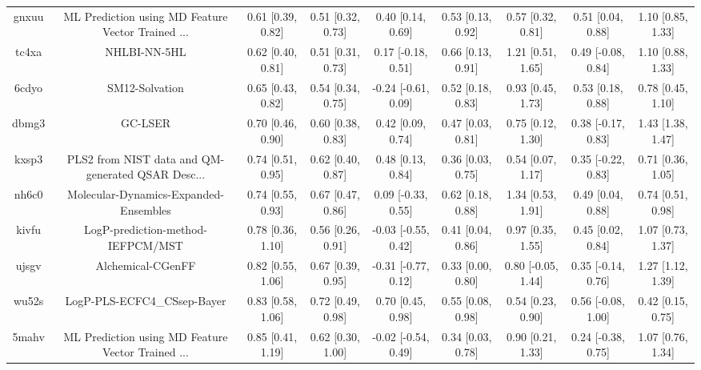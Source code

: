 \documentclass{article}
\begin{document}
\begin{center}
\begin{longtable}{|ccccccccc|}
 gnxuu &  ML Prediction using MD Feature Vector Trained ... &  0.61 [0.39, 0.82] &  0.51 [0.32, 0.73] &     0.40 [0.14, 0.69] &  0.53 [0.13, 0.92] &    0.57 [0.32, 0.81] &    0.51 [0.04, 0.88] &     1.10 [0.85, 1.33] \\
 tc4xa &                                       NHLBI-NN-5HL &  0.62 [0.40, 0.81] &  0.51 [0.31, 0.73] &    0.17 [-0.18, 0.51] &  0.66 [0.13, 0.91] &    1.21 [0.51, 1.65] &   0.49 [-0.08, 0.84] &     1.10 [0.88, 1.33] \\
 6cdyo &                                     SM12-Solvation &  0.65 [0.43, 0.82] &  0.54 [0.34, 0.75] &   -0.24 [-0.61, 0.09] &  0.52 [0.18, 0.83] &    0.93 [0.45, 1.73] &    0.53 [0.18, 0.88] &     0.78 [0.45, 1.10] \\
 dbmg3 &                                            GC-LSER &  0.70 [0.46, 0.90] &  0.60 [0.38, 0.83] &     0.42 [0.09, 0.74] &  0.47 [0.03, 0.81] &    0.75 [0.12, 1.30] &   0.38 [-0.17, 0.83] &     1.43 [1.38, 1.47] \\
 kxsp3 &  PLS2 from NIST data and QM-generated QSAR Desc... &  0.74 [0.51, 0.95] &  0.62 [0.40, 0.87] &     0.48 [0.13, 0.84] &  0.36 [0.03, 0.75] &    0.54 [0.07, 1.17] &   0.35 [-0.22, 0.83] &     0.71 [0.36, 1.05] \\
 nh6c0 &              Molecular-Dynamics-Expanded-Ensembles &  0.74 [0.55, 0.93] &  0.67 [0.47, 0.86] &    0.09 [-0.33, 0.55] &  0.62 [0.18, 0.88] &    1.34 [0.53, 1.91] &    0.49 [0.04, 0.88] &     0.74 [0.51, 0.98] \\
 kivfu &                  LogP-prediction-method-IEFPCM/MST &  0.78 [0.36, 1.10] &  0.56 [0.26, 0.91] &   -0.03 [-0.55, 0.42] &  0.41 [0.04, 0.86] &    0.97 [0.35, 1.55] &    0.45 [0.02, 0.84] &     1.07 [0.73, 1.37] \\
 ujsgv &                                  Alchemical-CGenFF &  0.82 [0.55, 1.06] &  0.67 [0.39, 0.95] &   -0.31 [-0.77, 0.12] &  0.33 [0.00, 0.80] &   0.80 [-0.05, 1.44] &   0.35 [-0.14, 0.76] &     1.27 [1.12, 1.39] \\
 wu52s &                        LogP-PLS-ECFC4\_CSsep-Bayer &  0.83 [0.58, 1.06] &  0.72 [0.49, 0.98] &     0.70 [0.45, 0.98] &  0.55 [0.08, 0.98] &    0.54 [0.23, 0.90] &   0.56 [-0.08, 1.00] &     0.42 [0.15, 0.75] \\
 5mahv &  ML Prediction using MD Feature Vector Trained ... &  0.85 [0.41, 1.19] &  0.62 [0.30, 1.00] &   -0.02 [-0.54, 0.49] &  0.34 [0.03, 0.78] &    0.90 [0.21, 1.33] &   0.24 [-0.38, 0.75] &     1.07 [0.76, 1.34] \\

\end{longtable}
\end{center}
\end{document}

